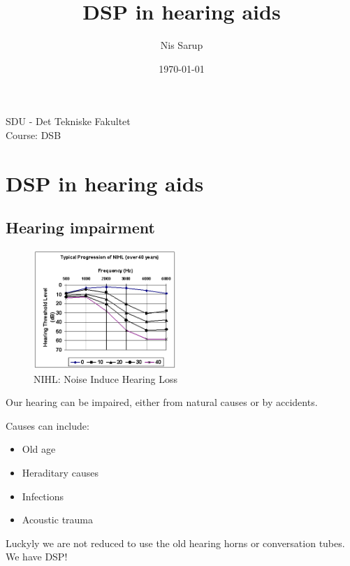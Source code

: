 \documentclass[a4wide,10pt]{article}
\begin{document}
\title{DSP in hearing aids}
\author{Nis Sarup}
\date{\today}
\maketitle
\begin{center}
	SDU - Det Tekniske Fakultet\\
	Course: DSB\\
\end{center}
\newpage

\section{DSP in hearing aids} %
\label{sec:dsp_in_hearing_aids}

\subsection{Hearing impairment} %
\label{sub:hearing_impairment}
\begin{figure}
	\vspace{-20pt}
	\begin{center}
		\includegraphics[width=0.48\textwidth]{images/nihl_graph.jpg}
	\end{center}
	\caption{NIHL: Noise Induce Hearing Loss}
	\vspace{-40pt}
\end{figure}
Our hearing can be impaired, either from natural causes or by accidents.


Causes can include:

\begin{itemize}
	\item Old age
	\item Heraditary causes
	\item Infections
	\item Acoustic trauma
\end{itemize}

Luckyly we are not reduced to use the old hearing horns or conversation tubes. We have DSP!
\end{document}
